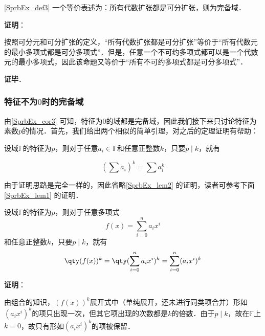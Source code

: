 \begin{theorem}{}\label{SprbEx_the5}
\autoref{SprbEx_def3} 一个等价表述为：所有代数扩张都是可分扩张，则为完备域．
\end{theorem}




\textbf{证明}：

按照可分元和可分扩张的定义，“所有代数扩张都是可分扩张”等价于“所有代数元的最小多项式都是可分多项式”．但是，任意一个不可约多项式都可以是一个代数元的最小多项式，因此该命题又等价于“所有不可约多项式都是可分多项式”．

\textbf{证毕}．









\subsubsection{特征不为$0$时的完备域}


由\autoref{SprbEx_cor3} 可知，特征为$0$的域都是完备域，因此我们接下来只讨论特征为素数$p$的情况．首先，我们给出两个相似的简单引理，对之后的定理证明有帮助：


\begin{lemma}{}\label{SprbEx_lem2}
设域$\mathbb{F}$的特征为$p$，则对于任意$a_i\in\mathbb{F}$和任意正整数$k$，只要$p\mid k$，就有

\begin{equation}
(\sum a_i)^k = \sum a_i^k
\end{equation}

\end{lemma}

由于证明思路是完全一样的，因此省略\autoref{SprbEx_lem2} 的证明，读者可参考下面\autoref{SprbEx_lem1} 的证明．


\begin{lemma}{}\label{SprbEx_lem1}
设域$\mathbb{F}$的特征为$p$，则对于任意多项式
\begin{equation}
f(x) = \sum_{i=0}^n a_ix^i
\end{equation}
和任意正整数$k$，只要$p\mid k$，就有
\begin{equation}
\qty(f(x))^k = \qty(\sum_{i=0}^n a_ix^i)^k = \sum_{i=0}^n (a_ix^i)^k
\end{equation}
\end{lemma}

\textbf{证明}：

由组合的知识，$(f(x))^k$展开式中（单纯展开，还未进行同类项合并）形如$(a_ix^i)^k$的项只出现一次，但其它项出现的次数都是$k$的倍数．由于$p\mid k$，故在$\mathbb{F}$上$k=0$，故只有形如$(a_ix^i)^k$的项被保留．

